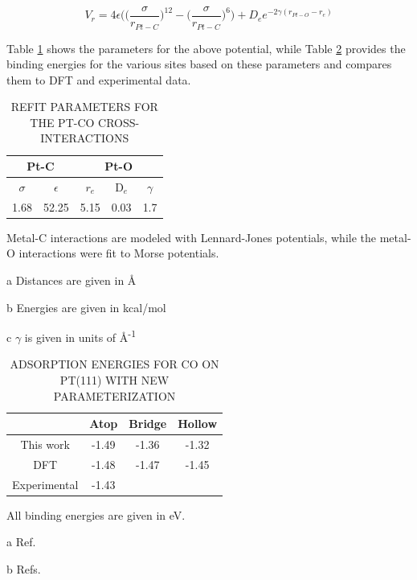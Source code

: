 \begin{equation}
V_{r} = 4\epsilon\bigg(\Big(\frac{\sigma}{r_{Pt-C}}\Big)^{12} - \Big(\frac{\sigma}{r_{Pt-C}}\Big)^{6}\bigg) + D_{e}e^{-2\gamma(r_{Pt-O}-r_{e})}
\end{equation}

Table \ref{table:pt-co} shows the parameters for the above potential, while
Table \ref{table:sites} provides the binding energies for the various sites
based on these parameters and compares them to DFT\citep{Deshlahra:2012aa} and
experimental data.\citep{Ertl:1977cg, Kelemen:1979ad}

\begin{table}
\caption{REFIT PARAMETERS FOR THE PT-CO CROSS-INTERACTIONS}
\centering
\begin{threeparttable}
\centering
\begin{tabular}{c c c c c}
\hline
\hline
\multicolumn{2}{c}{Pt-C} & \multicolumn{3}{c}{Pt-O}  \\
\hline
$\sigma$\tnote{a} & $\epsilon$\tnote{b} & $r_{e}$\tnote{a} & $\mathrm{D}_e$\tnote{b} & $\gamma$\tnote{c} \\
\hline
1.68 & 52.25 & 5.15 & 0.03 & 1.7 \\
\hline
\hline
\end{tabular}
\begin{tablenotes}
  \item Metal-C interactions are modeled with Lennard-Jones potentials, while the metal-O interactions were fit to Morse potentials.
  \item[a] Distances are given in \AA
  \item[b] Energies are given in kcal/mol
  \item[c] $\gamma$ is given in units of \AA\textsuperscript{-1}
\end{tablenotes}
\end{threeparttable}
\label{table:pt-co}
\end{table}

\begin{table}
\caption{ADSORPTION ENERGIES FOR CO ON PT(111) WITH NEW PARAMETERIZATION}
\centering
\begin{threeparttable}
\centering
\begin{tabular}{c c c c}
\hline
\hline
& Atop & Bridge & Hollow \\
\hline
This work & -1.49 & -1.36 & -1.32 \\
DFT\tnote{a} & -1.48 & -1.47 & -1.45 \\
Experimental\tnote{b} & -1.43 & & \\
\hline
\hline
\end{tabular}
\begin{tablenotes}
  \item All binding energies are given in eV.
  \item[a] Ref. \citep{Deshlahra:2012aa}
  \item[b] Refs. \citep{Ertl:1977cg, Kelemen:1979ad}
\end{tablenotes}
\end{threeparttable}
\label{table:sites}
\end{table}



